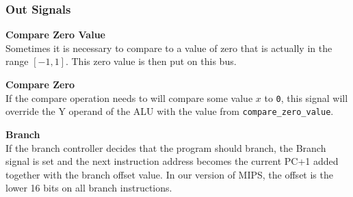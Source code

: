 \subsubsection{Out Signals}

\begin{description}
\item{\textbf{Compare Zero Value}} \\
Sometimes it is necessary to compare to a value of zero that is actually in the range $[-1,1]$.
This zero value is then put on this bus.

\item{\textbf{Compare Zero}} \\
If the compare operation needs to will compare some value $x$ to \texttt{0}, this signal will override the Y operand of the ALU with the value from \texttt{compare\_zero\_value}.

\item{\textbf{Branch}} \\
If the branch controller decides that the program should branch, the Branch signal is set and the next instruction address becomes the current PC+1 added together with the branch offset value.
In our version of MIPS, the offset is the lower 16 bits on all branch instructions.

\end{description}
